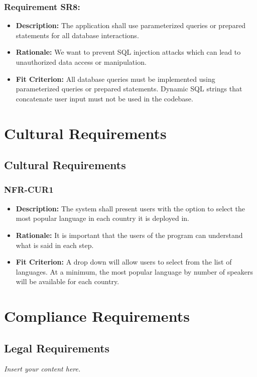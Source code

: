 \documentclass[12pt]{article}
\newcommand{\lips}{\textit{Insert your content here.}}
\begin{document}
\subsubsection*{Requirement SR8:}
\begin{itemize}
  \item \textbf{Description:} The application shall use parameterized queries or prepared statements for all database interactions.
  \item \textbf{Rationale:} We want to prevent SQL injection attacks which can lead to unauthorized data access or manipulation.
  \item \textbf{Fit Criterion:} All database queries must be implemented using parameterized queries or prepared statements. Dynamic SQL strings that concatenate user input must not be used in the codebase.
\end{itemize}

\section{Cultural Requirements}
\subsection{Cultural Requirements}
\subsubsection*{NFR-CUR1}
\begin{itemize}
  \item \textbf{Description:} The system shall present users with the option to select the most popular language in each country it is deployed in.
  \item \textbf{Rationale:} It is important that the users of the program can understand what is said in each step.
  \item \textbf{Fit Criterion:} A drop down will allow users to select from the list of languages. At a minimum, the most popular language by number of speakers will be available for each country.
\end{itemize}

\section{Compliance Requirements}
\subsection{Legal Requirements}
\lips
\end{document}
